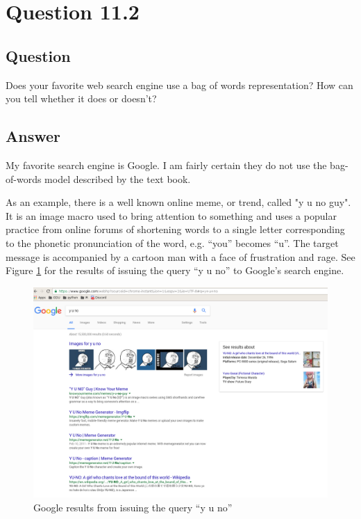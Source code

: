 \section{Question 11.2}

\subsection{Question}
Does your favorite web search engine use a bag of words representation?  How can you tell whether it does or doesn't?

\subsection{Answer}
My favorite search engine is Google.  I am fairly certain they do not use the bag-of-words model described by the text book.

As an example, there is a well known online meme, or trend, called "y u no guy".  It is an image macro used to bring attention to something and uses a popular practice from online forums of shortening words to a single letter corresponding to the phonetic pronunciation of the word, e.g. ``you'' becomes ``u''.  The target message is accompanied by a cartoon man with a face of frustration and rage.  See Figure \ref{fig:yuno} for the results of issuing the query ``y u no'' to Google's search engine.

\begin{figure}[H]
\centering
\label{fig:yuno}
\includegraphics[scale=.35]{q11.2/yuno.png}
\caption{Google results from issuing the query ``y u no''}
\end{figure}

